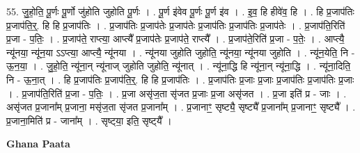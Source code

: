 \documentclass[17pt]{extarticle}
\begin{document}
55. जु॒हो॒ति॒ पू॒र्णः पू॒र्णो जु॑होति जुहोति पू॒र्णः । . पू॒र्ण इ॑वेव पू॒र्णः पू॒र्ण इ॑व । . इ॒व॒ हि हीवे॑व॒ हि । . हि प्र॒जाप॑तिः प्र॒जाप॑ति॒र्॒. हि हि प्र॒जाप॑तिः । . प्र॒जाप॑तिः प्र॒जाप॑तेः प्र॒जाप॑तेः प्र॒जाप॑तिः प्र॒जाप॑तिः प्र॒जाप॑तेः । . प्र॒जाप॑ति॒रिति॑ प्र॒जा - प॒तिः॒ । . प्र॒जाप॑ते॒ राप्त्या॒ आप्त्यै᳚ प्र॒जाप॑तेः प्र॒जाप॑ते॒ राप्त्यै᳚ । . प्र॒जाप॑ते॒रिति॑ प्र॒जा - प॒तेः॒ । . आप्त्यै॒ न्यू॑नया॒ न्यू॑न॒या ऽऽप्त्या॒ आप्त्यै॒ न्यू॑नया । . न्यू॑नया जुहोति जुहोति॒ न्यू॑नया॒ न्यू॑नया जुहोति । . न्यू॑न॒येति॒ नि - ऊ॒न॒या॒ । . जु॒हो॒ति॒ न्यू॑ना॒न् न्यू॑नाज् जुहोति जुहोति॒ न्यू॑नात् । . न्यू॑ना॒द्धि हि न्यू॑ना॒न् न्यू॑ना॒द्धि । . न्यू॑ना॒दिति॒ नि - ऊ॒ना॒त् । . हि प्र॒जाप॑तिः प्र॒जाप॑ति॒र्॒. हि हि प्र॒जाप॑तिः । . प्र॒जाप॑तिः प्र॒जाः प्र॒जाः प्र॒जाप॑तिः प्र॒जाप॑तिः प्र॒जाः । . प्र॒जाप॑ति॒रिति॑ प्र॒जा - प॒तिः॒ । . प्र॒जा असृ॑ज॒ता सृ॑जत प्र॒जाः प्र॒जा असृ॑जत । . प्र॒जा इति॑ प्र - जाः । . असृ॑जत प्र॒जाना᳚म् प्र॒जाना॒ मसृ॑ज॒ता सृ॑जत प्र॒जाना᳚म् । . प्र॒जानाꣳ॒॒ सृष्ट्यै॒ सृष्ट्यै᳚ प्र॒जाना᳚म् प्र॒जानाꣳ॒॒ सृष्ट्यै᳚ । . प्र॒जाना॒मिति॑ प्र - जाना᳚म् । . सृष्ट्‍या॒ इति॒ सृष्ट्‍यै᳚ । \newline

\textbf{Ghana Paata } \newline
\end{document}
